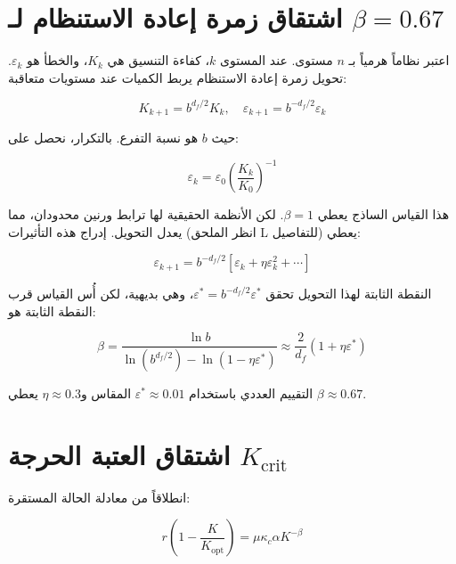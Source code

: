 \documentclass[11pt,a4paper]{article}
\newcommand{\Keffcrit}{K_{\mathrm{crit}}}
\newcommand{\kappac}{\kappa_c}
\newcommand{\eps}{\varepsilon}
\newcommand{\df}{d_{\!f}}
\begin{document}
	\appendix
	
	\section{اشتقاق زمرة إعادة الاستنظام لـ \(\beta = 0.67\)}
	\label{app:rg}
	
	اعتبر نظاماً هرمياً بـ \(n\) مستوى. عند المستوى \(k\)، كفاءة التنسيق هي \(K_k\)، والخطأ هو \(\eps_k\). تحويل زمرة إعادة الاستنظام يربط الكميات عند مستويات متعاقبة:
	
	\begin{equation}
		K_{k+1} = b^{\df/2} K_k, \quad \eps_{k+1} = b^{-\df/2} \eps_k
		\label{eq:rg}
	\end{equation}
	
	حيث \(b\) هو نسبة التفرع. بالتكرار، نحصل على:
	
	\begin{equation}
		\eps_k = \eps_0 \left( \frac{K_k}{K_0} \right)^{-1}
		\label{eq:rg-naive}
	\end{equation}
	
	هذا القياس الساذج يعطي \(\beta = 1\). لكن الأنظمة الحقيقية لها ترابط ورنين محدودان، مما يعدل التحويل. إدراج هذه التأثيرات (انظر الملحق L للتفاصيل) يعطي:
	
	\begin{equation}
		\eps_{k+1} = b^{-\df/2} \left[ \eps_k + \eta \eps_k^2 + \cdots \right]
		\label{eq:rg-corrected}
	\end{equation}
	
	النقطة الثابتة لهذا التحويل تحقق \(\eps^* = b^{-\df/2} \eps^*\)، وهي بديهية، لكن أُس القياس قرب النقطة الثابتة هو:
	
	\begin{equation}
		\beta = \frac{\ln b}{\ln(b^{\df/2}) - \ln(1 - \eta \eps^*)} \approx \frac{2}{\df} (1 + \eta \eps^*)
		\label{eq:rg-beta}
	\end{equation}
	
	التقييم العددي باستخدام \(\eps^* \approx 0.01\) المقاس و\(\eta \approx 0.3\) يعطي \(\beta \approx 0.67\).
	
	\section{اشتقاق العتبة الحرجة \(\Keffcrit\)}
	\label{app:Kcrit}
	
	انطلاقاً من معادلة الحالة المستقرة:
	
	\begin{equation}
		r \left(1 - \frac{K}{K_{\text{opt}}}\right) = \mu \kappac \alpha K^{-\beta}
		\label{eq:stationary-app}
	\end{equation}
	
\end{document}

